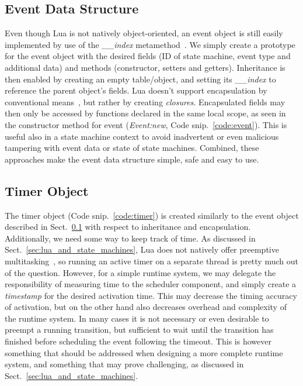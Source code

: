 \subsection{Event Data Structure}
\label{sec:impl_event}
Even though Lua is not natively object-oriented, an event object is still easily implemented by use of the \emph{\_\_index} metamethod~\cite[Ch. 13.4.1]{book:programming_in_lua_first}. We simply create a prototype for the event object with the desired fields (ID of state machine, event type and additional data) and methods (constructor, setters and getters). Inheritance is then enabled by creating an empty table/object, and setting its \emph{\_\_index} to reference the parent object's fields. Lua doesn't support encapsulation by conventional means~\cite[Ch. 16.4]{book:programming_in_lua_first}, but rather by creating \emph{closures}. Encapsulated fields may then only be accessed by functions declared in the same local scope, as seen in the constructor method for event (\emph{Event:new}, Code snip.~\ref{code:event}). This is useful also in a state machine context to avoid inadvertent or even malicious tampering with event data or state of state machines. Combined, these approaches make the event data structure simple, safe and easy to use.

\subsection{Timer Object}
\label{sec:impl_timer}
The timer object (Code snip.~\ref{code:timer}) is created similarly to the event object described in Sect.~\ref{sec:impl_event} with respect to inheritance and encapsulation. Additionally, we need some way to keep track of time. As discussed in Sect.~\ref{sec:lua_and_state_machines}, Lua does not natively offer preemptive multitasking~\cite[Ch. 2.6]{manual:lua_reference_manual}, so running an active timer on a separate thread is pretty much out of the question. However, for a simple runtime system, we may delegate the responsibility of measuring time to the scheduler component, and simply create a \emph{timestamp} for the desired activation time. This may decrease the timing accuracy of activation, but on the other hand also decreases overhead and complexity of the runtime system. In many cases it is not necessary or even desirable to preempt a running transition, but sufficient to wait until the transition has finished before scheduling the event following the timeout. This is however something that should be addressed when designing a more complete runtime system, and something that may prove challenging, as discussed in Sect.~\ref{sec:lua_and_state_machines}.

